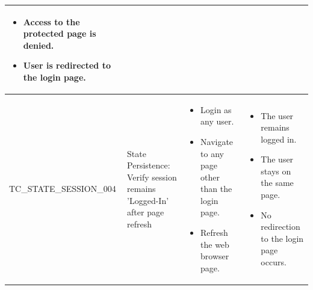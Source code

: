 \begin{longtable}{|>{\scriptsize\raggedright\arraybackslash}p{4cm}|>{\raggedright\arraybackslash}p{3cm}|>{\raggedright\arraybackslash}p{4cm}|>{\raggedright\arraybackslash}p{4cm}|}
\begin{itemize}[noitemsep, topsep=0pt, partopsep=0pt, leftmargin=*]
        \item Access to the protected page is denied.
        \item User is redirected to the login page.
    \end{itemize} \\ \hline
TC\_STATE\_SESSION\_004 & State Persistence: Verify session remains 'Logged-In' after page refresh & 
    \begin{itemize}[noitemsep, topsep=0pt, partopsep=0pt, leftmargin=*]
        \item Login as any user.
        \item Navigate to any page other than the login page.
        \item Refresh the web browser page.
    \end{itemize} & 
    \begin{itemize}[noitemsep, topsep=0pt, partopsep=0pt, leftmargin=*]
        \item The user remains logged in.
        \item The user stays on the same page.
        \item No redirection to the login page occurs.
    \end{itemize} \\ \hline
    
\end{longtable}